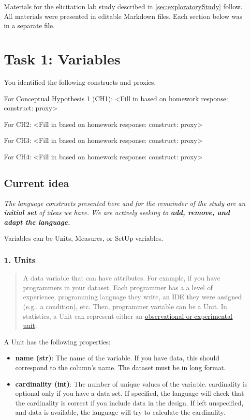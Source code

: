 Materials for the elicitation lab study described in
\autoref{sec:exploratoryStudy} follow. All materials were presented in editable
Markdown files. Each section below was in a separate file.

\section{Task 1: Variables}

You identified the following constructs and proxies.

For Conceptual Hypothesis 1 (CH1): <Fill in based on homework response: construct: proxy>

For CH2:  <Fill in based on homework response: construct: proxy>

For CH3: <Fill in based on homework response: construct: proxy>

For CH4: <Fill in based on homework response: construct: proxy>

\subsection*{Current idea}
\emph{The language constructs presented here and for the remainder of
the study are an \textbf{initial set} of ideas we have. We are actively
seeking to \textbf{add, remove, and adapt the language.}}

Variables can be Units, Measures, or SetUp variables.

\subsubsection{1. Units}

\begin{quote}
A data variable that can have attributes. For example, if you have
programmers in your dataset. Each programmer has a a level of
experience, programming language they write, an IDE they were assigned
(e.g., a condition), etc. Then, programmer variable can be a Unit. In
statistics, a Unit can represent either an
\href{https://en.wikipedia.org/wiki/Statistical_unit}{observational or
experimental unit}.
\end{quote}


A Unit has the following properties:
\begin{itemize}
    \item \textbf{name (str)}: The name of the variable. If you have data, this should correspond to the column's name. The dataset must be in long format.
    \item \textbf{cardinality (int)}: The number of unique values of the variable. cardinality is optional only if you have a data set. If specified, the language will check that the cardinality is correct if you include data in the design. If left unspecified, and data is available, the language will try to calculate the cardinality.
\end{itemize}

